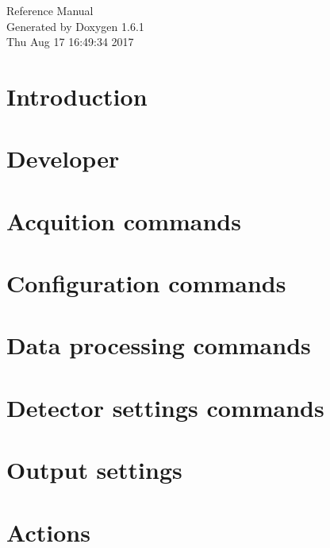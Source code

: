 \documentclass[a4paper]{article}
\begin{document}
\hypersetup{pageanchor=false}
\begin{titlepage}
\vspace*{7cm}
\begin{center}
{\Large Reference Manual}\\
\vspace*{1cm}
{\large Generated by Doxygen 1.6.1}\\
\vspace*{0.5cm}
{\small Thu Aug 17 16:49:34 2017}\\
\end{center}
\end{titlepage}
\tableofcontents
{}
\hypersetup{pageanchor=true}
\section{Introduction}
\label{index}\hypertarget{index}{}
\section{Developer}
\label{test}
\hypertarget{test}{}

\section{Acquition commands}
\label{acquisition}
\hypertarget{acquisition}{}

\section{Configuration commands}
\label{config}
\hypertarget{config}{}

\section{Data processing commands}
\label{data}
\hypertarget{data}{}

\section{Detector settings commands}
\label{settings}
\hypertarget{settings}{}

\section{Output settings}
\label{output}
\hypertarget{output}{}

\section{Actions}
\label{actions}
\hypertarget{actions}{}

\end{document}
